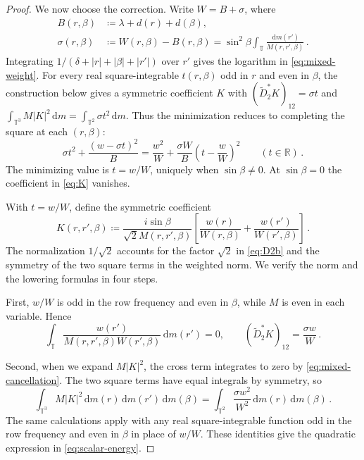 \documentclass[11pt]{amsart}
\theoremstyle{plain}
\theoremstyle{definition}
\newcommand{\R}{\mathbb R}
\newcommand{\T}{\mathbb T}
\newcommand{\1}{\mathbf 1}
\newcommand{\abs}[1]{\lvert #1\rvert}
\newcommand{\dd}{\,\mathrm d}
\begin{document}
\begin{proof}
We now choose the correction.  Write $W=B+\sigma$, where
\begin{align}
  B(r,\beta)&\coloneqq\lambda+d(r)+d(\beta),\label{eq:B}\\
  \sigma(r,\beta)&\coloneqq W(r,\beta)-B(r,\beta)
  =\sin^2\beta\int_\T\frac{\dd m(r')}{M(r,r',\beta)}\, .\label{eq:sigma}
\end{align}
Integrating $1/(\delta+\abs r+\abs\beta+\abs{r'})$ over $r'$ gives
the logarithm in \eqref{eq:mixed-weight}.
For every real square-integrable $t(r,\beta)$ odd in $r$ and even in
$\beta$, the construction below gives a symmetric coefficient $K$ with
$(\widetilde D_2^*K)_{12}=\sigma t$ and
$\int_{\T^3}M\abs K^2\dd m=\int_{\T^2}\sigma t^2\dd m$.
Thus the minimization reduces to completing the square at each
$(r,\beta)$:
\begin{equation}\label{eq:scalar-energy}
  \sigma t^2+\frac{(w-\sigma t)^2}{B}
  =\frac{w^2}{W}+\frac{\sigma W}{B}
    \left(t-\frac wW\right)^2
  \qquad(t\in\R)\, .
\end{equation}
The minimizing value is $t=w/W$, uniquely when $\sin\beta\ne0$.
At $\sin\beta=0$ the coefficient in \eqref{eq:K} vanishes.

With $t=w/W$, define the symmetric coefficient
\begin{equation}\label{eq:K}
  K(r,r',\beta)\coloneqq
  \frac{i\sin\beta}{\sqrt2 M(r,r',\beta)}
  \left[\frac{w(r)}{W(r,\beta)}+
        \frac{w(r')}{W(r',\beta)}\right]\, .
\end{equation}
The normalization $1/\sqrt2$ accounts for the factor $\sqrt2$ in
\eqref{eq:D2b} and the symmetry of the two square terms in the weighted norm.
We verify the norm and the lowering formulas in four steps.

First, $w/W$ is odd in the row frequency and even in $\beta$, while
$M$ is even in each variable.  Hence
\begin{equation}\label{eq:mixed-cancellation}
  \int_\T\frac{w(r')}{M(r,r',\beta)W(r',\beta)}\dd m(r')=0,
  \qquad (\widetilde D_2^*K)_{12}=\frac{\sigma w}{W}\, .
\end{equation}

Second, when we expand $M\abs K^2$, the cross term integrates to zero by
\eqref{eq:mixed-cancellation}.  The two square terms have equal integrals
by symmetry, so
\begin{equation}\label{eq:parity-energy}
  \int_{\T^3}M\abs K^2\dd m(r)\dd m(r')\dd m(\beta)
  =\int_{\T^2}\frac{\sigma w^2}{W^2}\dd m(r)\dd m(\beta)\, .
\end{equation}
The same calculations apply with any real square-integrable function
odd in the row frequency and even in $\beta$ in place of $w/W$.
These identities give the quadratic expression in \eqref{eq:scalar-energy}.


\end{proof}
\end{document}

